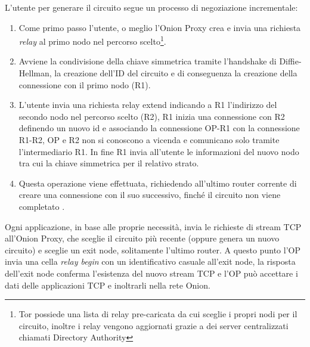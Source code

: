 L'utente per generare il circuito segue un processo di negoziazione incrementale:
\begin{enumerate}
    \item Come primo passo l'utente, o meglio l'Onion Proxy crea e invia una richiesta \emph{relay} al primo nodo nel percorso scelto\footnote{Tor possiede una lista di relay pre-caricata da cui sceglie i propri nodi per il circuito, inoltre i relay vengono aggiornati grazie a dei server centralizzati chiamati Directory Authority}.
    \item Avviene la condivisione della chiave simmetrica tramite l'handshake di Diffie-Hellman, la creazione dell'ID del circuito e di conseguenza la creazione della connessione con il primo nodo (R1).
    \item L'utente invia una richiesta relay extend indicando a R1 l'indirizzo del secondo nodo nel percorso scelto (R2), R1 inizia una connessione con R2 definendo un nuovo id e associando la connessione OP-R1 con la connessione R1-R2, OP e R2 non si conoscono a vicenda e comunicano solo tramite l'intermediario R1. In fine R1 invia all'utente le informazioni del nuovo nodo tra cui la chiave simmetrica per il relativo strato.
    \item Questa operazione viene effettuata, richiedendo all'ultimo router corrente di creare una connessione con il suo successivo, finché il circuito non viene completato \cite{ChaumMixes}.
\end{enumerate}
Ogni applicazione, in base alle proprie necessità, invia le richieste di stream TCP all'Onion Proxy, che sceglie il circuito più recente (oppure genera un nuovo circuito) e sceglie un exit node, solitamente l'ultimo router. 
A questo punto l'OP invia una cella \emph{relay begin} con un identificativo casuale all'exit node, la risposta dell'exit node conferma l'esistenza del nuovo stream TCP e l'OP può accettare i dati delle applicazioni TCP e inoltrarli nella rete Onion. \\


